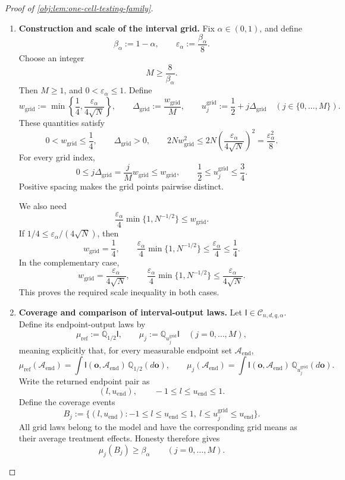 \begin{proof}[Proof of \cref{obj:lem:one-cell-testing-family}]
\begin{enumerate}
\item \textbf{Construction and scale of the interval grid.}
Fix \(\alpha\in(0,1)\), and define
\[
\beta_\alpha:=1-\alpha,
\qquad
\varepsilon_\alpha:=\frac{\beta_\alpha}{8}.
\]
Choose an integer
\[
M\ge\frac8{\beta_\alpha}.
\]
Then \(M\ge1\), and \(0<\varepsilon_\alpha\le1\). Define
\[
w_{\mathrm{grid}}
:=
\min\left\{\frac14,
           \frac{\varepsilon_\alpha}{4\sqrt N}\right\},
\qquad
\Delta_{\mathrm{grid}}:=\frac{w_{\mathrm{grid}}}{M},
\qquad
u_j^{\mathrm{grid}}
:=
\frac12+j\Delta_{\mathrm{grid}}
\quad(j\in\{0,\ldots,M\}).
\]
These quantities satisfy
\[
0<w_{\mathrm{grid}}\le\frac14,
\qquad
\Delta_{\mathrm{grid}}>0,
\qquad
2Nw_{\mathrm{grid}}^2
\le
2N\left(\frac{\varepsilon_\alpha}{4\sqrt N}\right)^2
=
\frac{\varepsilon_\alpha^2}{8}.
\]
For every grid index,
\[
0\le j\Delta_{\mathrm{grid}}
=\frac{j}{M}w_{\mathrm{grid}}
\le w_{\mathrm{grid}},
\qquad
\frac12\le u_j^{\mathrm{grid}}\le\frac34.
\]
Positive spacing makes the grid points pairwise distinct.

We also need
\[
\frac{\varepsilon_\alpha}{4}
\min\{1,N^{-1/2}\}
\le w_{\mathrm{grid}}.
\]
If \(1/4\le\varepsilon_\alpha/(4\sqrt N)\), then
\[
w_{\mathrm{grid}}=\frac14,
\qquad
\frac{\varepsilon_\alpha}{4}
\min\{1,N^{-1/2}\}
\le\frac{\varepsilon_\alpha}{4}\le\frac14.
\]
In the complementary case,
\[
w_{\mathrm{grid}}
=\frac{\varepsilon_\alpha}{4\sqrt N},
\qquad
\frac{\varepsilon_\alpha}{4}
\min\{1,N^{-1/2}\}
\le\frac{\varepsilon_\alpha}{4\sqrt N}.
\]
This proves the required scale inequality in both cases.

\item \textbf{Coverage and comparison of interval-output laws.}
Let \(\mathsf I\in\mathcal C_{n,d,q,\alpha}\). Define its endpoint-output laws by
\[
\mu_{\mathrm{ref}}
:=
\mathbb Q_{1/2}\mathsf I,
\qquad
\mu_j:=\mathbb Q_{u_j^{\mathrm{grid}}}\mathsf I
\quad(j=0,\ldots,M),
\]
meaning explicitly that, for every measurable endpoint set \(\mathscr A_{\mathrm{end}}\),
\[
\mu_{\mathrm{ref}}(\mathscr A_{\mathrm{end}})
=
\int\mathsf I(\boldsymbol o,\mathscr A_{\mathrm{end}})\,
     \mathbb Q_{1/2}(d\boldsymbol o),
\qquad
\mu_j(\mathscr A_{\mathrm{end}})
=
\int\mathsf I(\boldsymbol o,\mathscr A_{\mathrm{end}})\,
     \mathbb Q_{u_j^{\mathrm{grid}}}(d\boldsymbol o).
\]
Write the returned endpoint pair as
\[
(l,u_{\mathrm{end}}),\qquad -1\le l\le u_{\mathrm{end}}\le1.
\]
Define the coverage events
\[
B_j:=
\{(l,u_{\mathrm{end}}):-1\le l\le u_{\mathrm{end}}\le1,\ 
          l\le u_j^{\mathrm{grid}}\le u_{\mathrm{end}}\}.
\]
All grid laws belong to the model and have the corresponding grid means as their average treatment effects. Honesty therefore gives
\[
\mu_j(B_j)\ge\beta_\alpha
\qquad(j=0,\ldots,M).
\]


\end{enumerate}
\end{proof}
